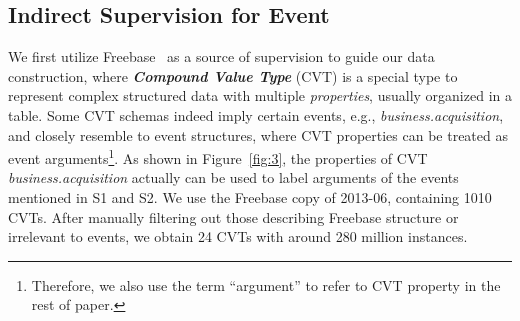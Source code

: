 %

\subsection{Indirect Supervision for Event}%
We first utilize Freebase~\cite{bollacker2008freebase} as a source of supervision to guide our data construction, %
where \textbf{\emph{Compound Value Type}} (CVT) is a special type to represent complex structured data %
with multiple \emph{properties}, usually organized in a table. Some CVT schemas indeed imply certain events, e.g., \emph{business.acquisition},
and closely resemble to event structures, where CVT properties can be treated as event arguments\footnote{
Therefore, we also use the term ``argument'' to refer to CVT property in the rest of paper.}. %
As shown in Figure~\ref{fig:3}, the properties of CVT \emph{business.acquisition} actually can be used to label arguments of the events mentioned in S1 and S2.
We use the Freebase copy of 2013-06,  %
containing 1010 CVTs. After manually filtering out those %
describing Freebase structure or irrelevant to events, %
 we obtain 24 CVTs with around 280 million instances.

